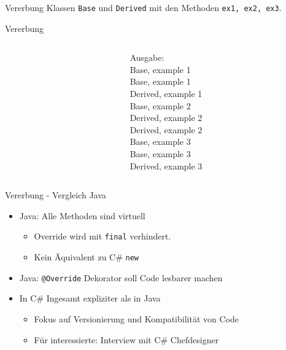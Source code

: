 \documentclass[11pt]{beamer}
\begin{document}
\begin{frame}{Vererbung}
	Klassen \texttt{Base} und \texttt{Derived} mit den Methoden \texttt{ex1, ex2, ex3}.
\end{frame}

\begin{frame}{Vererbung}
	\begin{columns}
		\begin{column}{0.7\textwidth}
		\end{column}
		\begin{column}{0.3\textwidth}
		Ausgabe: \\
Base, example 1\\
Base, example 1\\
Derived, example 1\\
Base, example 2\\
Derived, example 2\\
Derived, example 2\\
Base, example 3\\
Base, example 3\\
Derived, example 3
			
		\end{column}
	

	\end{columns}


\end{frame}

\begin{frame}{Vererbung - Vergleich Java}
	
	\begin{itemize}
		\item Java: Alle Methoden sind virtuell
		\begin{itemize}
			\item Override wird mit \texttt{final} verhindert.
			\item Kein Äquivalent zu C\# \texttt{new}
		\end{itemize}
		\item Java: \texttt{@Override} Dekorator soll Code lesbarer machen
		\item In C\# Ingesamt expliziter als in Java
		\begin{itemize}
			\item Fokus auf Versionierung und Kompatibilität von Code
			\item Für interessierte: Interview mit C\# Chefdesigner \cite{interview_virtual}
		\end{itemize}
	\end{itemize}

\end{frame}
\end{document}
